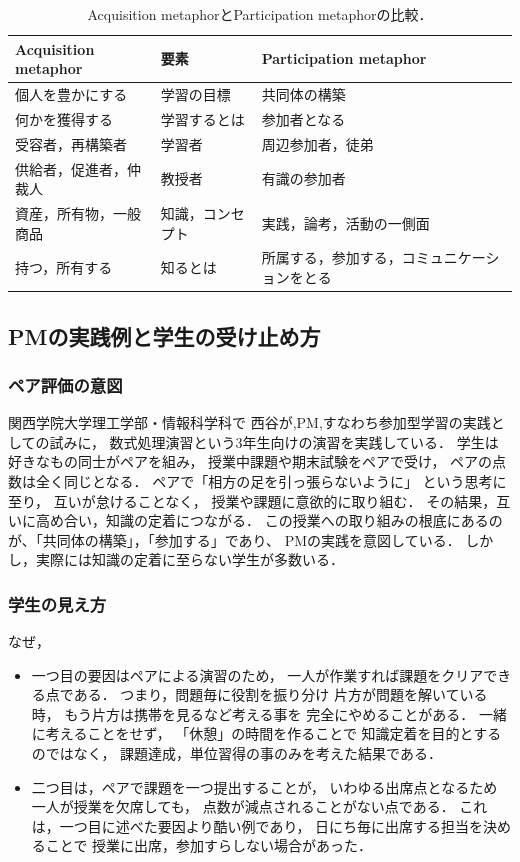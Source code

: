 \documentclass[a4,p11]{article}
\begin{document}
\begin{table}[bt]
\caption{\label{tab:orge53c99f}
Acquisition metaphorとParticipation metaphorの比較．}
\centering
\begin{tabular}{lll}
\hline
Acquisition metaphor & 要素 & Participation metaphor\\
\hline
個人を豊かにする & 学習の目標 & 共同体の構築\\
何かを獲得する & 学習するとは & 参加者となる\\
受容者，再構築者 & 学習者 & 周辺参加者，徒弟\\
供給者，促進者，仲裁人 & 教授者 & 有識の参加者\\
資産，所有物，一般商品 & 知識，コンセプト & 実践，論考，活動の一側面\\
持つ，所有する & 知るとは & 所属する，参加する，コミュニケーションをとる\\
\hline
\end{tabular}
\end{table}

\subsection{PMの実践例と学生の受け止め方}
\label{sec:org24e1b4b}
\subsubsection{ペア評価の意図}
\label{sec:org2ec1a84}
関西学院大学理工学部・情報科学科で
西谷が,PM,すなわち参加型学習の実践としての試みに，
数式処理演習という3年生向けの演習を実践している．
学生は好きなもの同士がペアを組み，
授業中課題や期末試験をペアで受け，
ペアの点数は全く同じとなる．
ペアで「相方の足を引っ張らないように」
という思考に至り，
互いが怠けることなく，
授業や課題に意欲的に取り組む．
その結果，互いに高め合い，知識の定着につながる．
この授業への取り組みの根底にあるのが、「共同体の構築」，「参加する」であり、
PMの実践を意図している．
しかし，実際には知識の定着に至らない学生が多数いる．
\subsubsection{学生の見え方}
\label{sec:orgcdfe227}
なぜ，
\begin{itemize}
\item 一つ目の要因はペアによる演習のため，
一人が作業すれば課題をクリアできる点である．
つまり，問題毎に役割を振り分け 
片方が問題を解いている時，
もう片方は携帯を見るなど考える事を
完全にやめることがある．
一緒に考えることをせず，
「休憩」の時間を作ることで
知識定着を目的とするのではなく，
課題達成，単位習得の事のみを考えた結果である．

\item 二つ目は，ペアで課題を一つ提出することが，
いわゆる出席点となるため
一人が授業を欠席しても，
点数が減点されることがない点である．
これは，一つ目に述べた要因より酷い例であり，
日にち毎に出席する担当を決めることで
授業に出席，参加すらしない場合があった．
\end{itemize}
\end{document}

